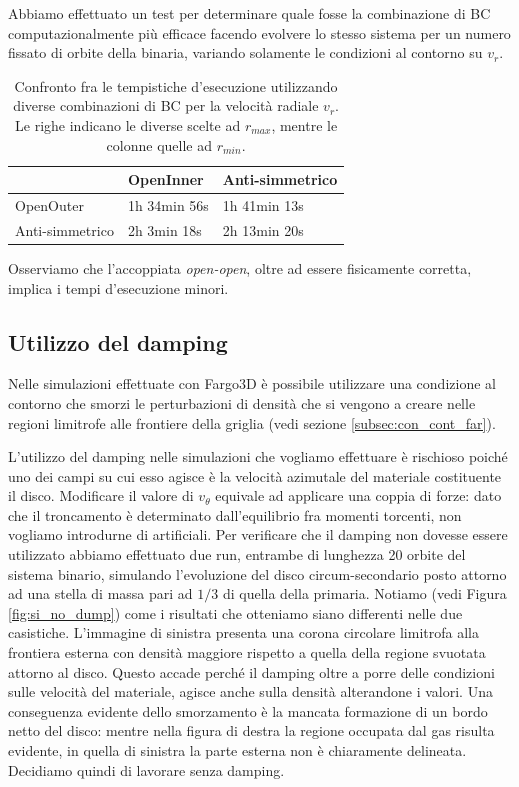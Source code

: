 Abbiamo effettuato un test per determinare quale fosse la combinazione di BC computazionalmente più efficace facendo evolvere lo stesso sistema per un numero fissato di orbite della binaria, variando solamente le condizioni al contorno su $v_r$.
\begin{table}[H]
\begin{center}
\begin{tabular}{|C{3cm}|C{3cm}|C{3cm}|}
\hline
{}
 & OpenInner & Anti-simmetrico\\
\hline
{} OpenOuter & 1h 34min 56s  & 1h 41min 13s\\
\hline
{} Anti-simmetrico & 2h 3min 18s & 2h 13min 20s \\
\hline
\end{tabular}
\caption{Confronto fra le tempistiche d'esecuzione utilizzando diverse combinazioni di BC per la velocità radiale $v_r$. Le righe indicano le diverse scelte ad $r_{max}$, mentre le colonne quelle ad $r_{min}$.}
\label{tab:coor_Fargo3D}
\end{center}
\end{table}
Osserviamo che l'accoppiata \textit{open-open}, oltre ad essere fisicamente corretta, implica i tempi d'esecuzione minori. 

\subsection{Utilizzo del damping}

Nelle simulazioni effettuate con Fargo3D è possibile utilizzare una condizione al contorno che smorzi le perturbazioni di densità che si vengono a creare nelle regioni limitrofe alle frontiere della griglia (vedi sezione \ref{subsec:con_cont_far}). 

L'utilizzo del damping nelle simulazioni che vogliamo effettuare è rischioso poiché uno dei campi su cui esso agisce è la velocità azimutale del materiale costituente il disco. 
Modificare il valore di $v_{\theta}$ equivale ad applicare una coppia di forze: dato che il troncamento è determinato dall'equilibrio fra momenti torcenti, non vogliamo introdurne di artificiali.
Per verificare che il damping non dovesse essere utilizzato abbiamo effettuato due run, entrambe di lunghezza 20 orbite del sistema binario, simulando l'evoluzione del disco circum-secondario posto attorno ad una stella di massa pari ad $1/3$ di quella della primaria.
Notiamo (vedi Figura \ref{fig:si_no_dump}) come i risultati che otteniamo siano differenti nelle due casistiche.
L'immagine di sinistra presenta una corona circolare limitrofa alla frontiera esterna con densità maggiore rispetto a quella della regione svuotata attorno al disco.
Questo accade perché il damping oltre a porre delle condizioni sulle velocità del materiale, agisce anche sulla densità alterandone i valori.
Una conseguenza evidente dello smorzamento è la mancata formazione di un bordo netto del disco: mentre nella figura di destra la regione occupata dal gas risulta evidente, in quella di sinistra la parte esterna non è chiaramente delineata. Decidiamo quindi di lavorare senza damping.

